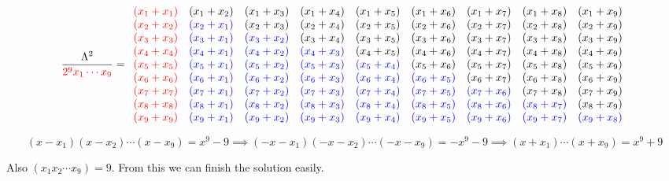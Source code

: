 \documentclass[11]{article}
\begin{document}
\[
\frac{\Lambda^2}{\textcolor{red}{2^9 x_1\dotsm x_9}} =
\begin{array}{lllllllll}
\textcolor{red}{(x_1+x_1)} & (x_1+x_2) & (x_1+x_3) & (x_1+x_4) & (x_1+x_5) & (x_1+x_6) & (x_1+x_7) & (x_1+x_8) & (x_1+x_9) \\
\textcolor{red}{(x_2+x_2)} & \textcolor{blue}{(x_2+x_1)} & (x_2+x_3) & (x_2+x_4) & (x_2+x_5) & (x_2+x_6) & (x_2+x_7) & (x_2+x_8) & (x_2+x_9) \\
\textcolor{red}{(x_3+x_3)} & \textcolor{blue}{(x_3+x_1)} & \textcolor{blue}{(x_3+x_2)} & (x_3+x_4) & (x_3+x_5) & (x_3+x_6) & (x_3+x_7) & (x_3+x_8) & (x_3+x_9) \\
\textcolor{red}{(x_4+x_4)} & \textcolor{blue}{(x_4+x_1)} & \textcolor{blue}{(x_4+x_2)} & \textcolor{blue}{(x_4+x_3)} & (x_4+x_5) & (x_4+x_6) & (x_4+x_7) & (x_4+x_8) & (x_4+x_9) \\
\textcolor{red}{(x_5+x_5)} & \textcolor{blue}{(x_5+x_1)} & \textcolor{blue}{(x_5+x_2)} & \textcolor{blue}{(x_5+x_3)} & \textcolor{blue}{(x_5+x_4)} & (x_5+x_6) & (x_5+x_7) & (x_5+x_8) & (x_5+x_9) \\
\textcolor{red}{(x_6+x_6)} & \textcolor{blue}{(x_6+x_1)} & \textcolor{blue}{(x_6+x_2)} & \textcolor{blue}{(x_6+x_3)} & \textcolor{blue}{(x_6+x_4)} & \textcolor{blue}{(x_6+x_5)} & (x_6+x_7) & (x_6+x_8) & (x_6+x_9) \\
\textcolor{red}{(x_7+x_7)} & \textcolor{blue}{(x_7+x_1)} & \textcolor{blue}{(x_7+x_2)} & \textcolor{blue}{(x_7+x_3)} & \textcolor{blue}{(x_7+x_4)} & \textcolor{blue}{(x_7+x_5)} & \textcolor{blue}{(x_7+x_6)} & (x_7+x_8) & (x_7+x_9) \\
\textcolor{red}{(x_8+x_8)} & \textcolor{blue}{(x_8+x_1)} & \textcolor{blue}{(x_8+x_2)} & \textcolor{blue}{(x_8+x_3)} & \textcolor{blue}{(x_8+x_4)} & \textcolor{blue}{(x_8+x_5)} & \textcolor{blue}{(x_8+x_6)} & \textcolor{blue}{(x_8+x_7)} & (x_8+x_9) \\
\textcolor{red}{(x_9+x_9)} & \textcolor{blue}{(x_9+x_1)} & \textcolor{blue}{(x_9+x_2)} & \textcolor{blue}{(x_9+x_3)} & \textcolor{blue}{(x_9+x_4)} & \textcolor{blue}{(x_9+x_5)} & \textcolor{blue}{(x_9+x_6)} & \textcolor{blue}{(x_9+x_7)} & \textcolor{blue}{(x_9+x_8)}
\end{array}
\]

\[ (x-x_1)(x-x_2)\dotsm(x-x_9) = x^9 -9\implies(-x-x_1)(-x-x_2)\dotsm(-x-x_9) = -x^9 - 9 \implies (x+x_1)\dotsm(x+x_9) = x^9 + 9 \]

Also $(x_1 x_2 \dotsm x_9) = 9$. From this we can finish the solution easily.
\end{document}
